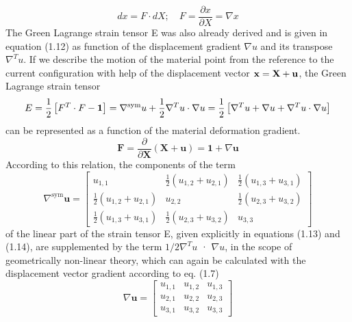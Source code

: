 \begin{equation}
    dx = F \cdot dX; \quad F = \frac{{\partial x}}{{\partial X}} = \nabla x
\end{equation}
The Green Lagrange strain tensor E was also already derived and is given in equation (1.12) as function of the displacement gradient $\nabla u$ and its transpose ${\nabla ^T}u$. If we describe the
motion of the material point from the reference to the current configuration with help of the
displacement vector $\bf x = X + u$, the Green Lagrange strain tensor
\begin{equation}
    \label{5.7}
    E = \frac{1}{2}\left[ {{F^T} \cdot F - {\bf{1}}} \right] = {\nabla ^{{\rm{sym}}}}u + \frac{1}{2}{\nabla ^T}u \cdot \nabla u = \frac{1}{2}\left[ {{\nabla ^T}u + \nabla u + {\nabla ^T}u \cdot \nabla u} \right]
\end{equation}
can be represented as a function of the material deformation gradient.
\begin{equation}
 \boldsymbol{F}=\frac{\partial}{\partial \boldsymbol{X}}(\boldsymbol{X}+\boldsymbol{u})=\mathbf{1}+\nabla \boldsymbol{u} 
\end{equation}
According to this relation, the components of the term
\begin{equation}
 \nabla^{\operatorname{sym}} \boldsymbol{u}=\left[\begin{array}{ccc}u_{1,1} & \frac{1}{2}\left(u_{1,2}+u_{2,1}\right) & \frac{1}{2}\left(u_{1,3}+u_{3,1}\right) \\ \frac{1}{2}\left(u_{1,2}+u_{2,1}\right) & u_{2,2} & \frac{1}{2}\left(u_{2,3}+u_{3,2}\right) \\ \frac{1}{2}\left(u_{1,3}+u_{3,1}\right) & \frac{1}{2}\left(u_{2,3}+u_{3,2}\right) & u_{3,3}\end{array}\right] 
\end{equation}
of the linear part of the strain tensor E, given explicitly in equations (1.13) and (1.14), are
supplemented by the term $1/2 \nabla^T u$ · $\nabla u$, in the scope of geometrically non-linear theory, which can again be calculated with the displacement vector gradient according to eq. (1.7)
\begin{equation}
 \nabla \boldsymbol{u}=\left[\begin{array}{lll}u_{1,1} & u_{1,2} & u_{1,3} \\ u_{2,1} & u_{2,2} & u_{2,3} \\ u_{3,1} & u_{3,2} & u_{3,3}\end{array}\right] 
\end{equation}
